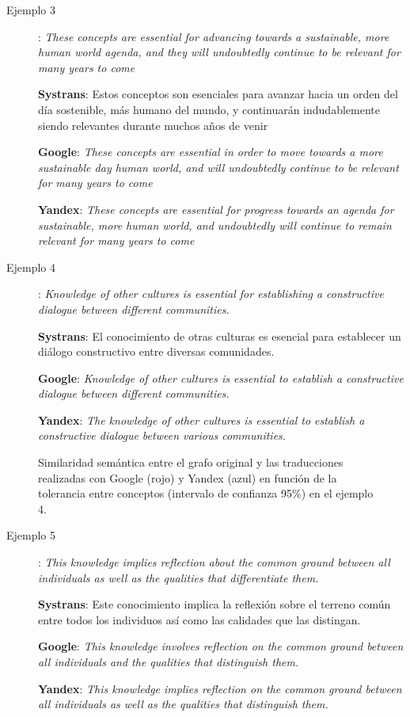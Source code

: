 \documentclass[a4paper,12pt,spanish]{book}
\begin{document}
\begin{description}
\item[{Ejemplo 3}] \leavevmode
: \emph{These concepts are essential for advancing towards a sustainable, more human world agenda, and they will undoubtedly continue to be relevant for many years to come}

\textbf{Systrans}: Estos conceptos son esenciales para avanzar hacia un orden del día sostenible, más humano del mundo, y continuarán indudablemente siendo relevantes durante muchos años de venir

\textbf{Google}: \emph{These concepts are essential in order to move towards a more sustainable day human world, and will undoubtedly continue to be relevant for many years to come}

\textbf{Yandex}: \emph{These concepts are essential for progress towards an agenda for sustainable, more human world, and undoubtedly will continue to remain relevant for many years to come}

\item[{Ejemplo 4}] \leavevmode
: \emph{Knowledge of other cultures is essential for establishing a constructive dialogue between different communities.}

\textbf{Systrans}: El conocimiento de otras culturas es esencial para establecer un diálogo constructivo entre diversas comunidades.

\textbf{Google}: \emph{Knowledge of other cultures is essential to establish a constructive dialogue between different communities.}

\textbf{Yandex}: \emph{The knowledge of other cultures is essential to establish a constructive dialogue between various communities.}

\end{description}
\begin{figure}[htbp]
\centering
\capstart

\caption{Similaridad semántica entre el grafo original y las traducciones realizadas con Google (rojo) y Yandex (azul) en función de la tolerancia entre conceptos (intervalo de confianza 95\%) en el ejemplo 4.}\label{5.pruebas/index:sample04-relation-tol-0}\end{figure}
\begin{description}
\item[{Ejemplo 5}] \leavevmode
: \emph{This knowledge implies reflection about the common ground between all individuals as well as the qualities that differentiate them.}

\textbf{Systrans}: Este conocimiento implica la reflexión sobre el terreno común entre todos los individuos así como las calidades que las distingan.

\textbf{Google}: \emph{This knowledge involves reflection on the common ground between all individuals and the qualities that distinguish them.}

\textbf{Yandex}: \emph{This knowledge implies reflection on the common ground between all individuals as well as the qualities that distinguish them.}

\end{description}
\end{document}
